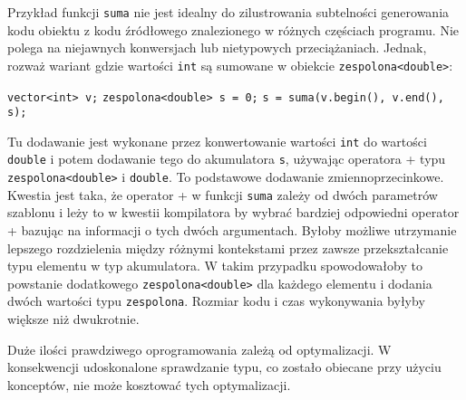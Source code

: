 \documentclass[11pt, a4paper]{article}
\begin{document}
Przykład funkcji \verb#suma# nie jest idealny do zilustrowania subtelności generowania kodu obiektu z kodu źródłowego znalezionego w różnych częściach programu. Nie polega na niejawnych konwersjach lub nietypowych przeciążaniach. Jednak, rozważ wariant gdzie wartości \verb#int# są sumowane w obiekcie \verb#zespolona<double>#: \newline

\noindent \verb#vector<int> v;#  \newline
\verb#zespolona<double> s = 0;#  \newline
\verb#s = suma(v.begin(), v.end(), s);#  \newline

Tu dodawanie jest wykonane przez konwertowanie wartości \verb#int# do wartości \verb#double# i potem dodawanie tego do akumulatora \verb#s#, używając operatora + typu \verb#zespolona<double># i \verb#double#. To podstawowe dodawanie zmiennoprzecinkowe. Kwestia jest taka, że operator + w funkcji \verb#suma# zależy od dwóch parametrów szablonu i leży to w kwestii kompilatora by wybrać bardziej odpowiedni operator + bazując na informacji o tych dwóch argumentach. Byłoby możliwe utrzymanie lepszego rozdzielenia między różnymi kontekstami przez zawsze przekształcanie typu elementu w typ akumulatora. W takim przypadku spowodowałoby to powstanie dodatkowego \verb#zespolona<double># dla każdego elementu i dodania dwóch wartości typu \verb#zespolona#. Rozmiar kodu i czas wykonywania byłyby większe niż dwukrotnie.

Duże ilości prawdziwego oprogramowania zależą od optymalizacji. W konsekwencji udoskonalone sprawdzanie typu, co zostało obiecane przy użyciu konceptów, nie może kosztować tych optymalizacji.
\end{document}
